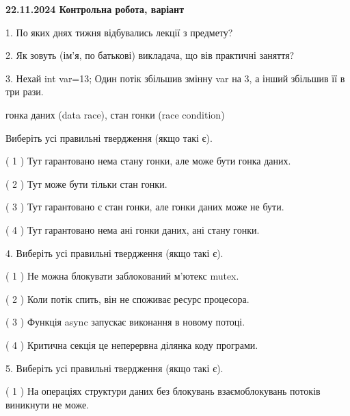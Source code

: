 \documentclass[12pt, ukrainian]{article}
\begin{document}
\vspace{4mm}
\newpage
\begin {large}

\textbf{22.11.2024 Контрольна робота, варіант  }\par


{
1. По яких днях тижня відбувались лекції з предмету?



\vspace{5mm}
2. Як зовуть (ім'я, по батькові) викладача, що вів практичні заняття?



\vspace{5mm}
3. Нехай int var=13; Один потік збільшив змінну var на 3, а інший збільшив її в три рази.

гонка даних (data race), стан гонки (race condition)

Виберіть усі правильні твердження (якщо такі є).\par
\vspace{2mm}
( 1 ) Тут гарантовано нема стану гонки, але може бути гонка даних.%

( 2 ) Тут може бути тільки стан гонки.%

( 3 ) Тут гарантовано є стан гонки, але гонки даних може не бути.%

( 4 ) Тут гарантовано нема ані гонки даних, ані стану гонки.%


\vspace{5mm}
4. Виберіть усі правильні твердження (якщо такі є).\par
\vspace{2mm}

( 1 ) Не можна блокувати заблокований м’ютекс mutex.%

( 2 ) Коли потік спить, він не споживає ресурс процесора.%

( 3 ) Функція async запускає виконання в новому потоці.%

( 4 ) Критична секція це неперервна ділянка коду програми.%


\vspace{5mm}
5. Виберіть усі правильні твердження (якщо такі є).\par
\vspace{2mm}

( 1 ) На операціях структури даних без блокувань взаємоблокувань потоків виникнути не може.%

}
\end{large}
\end{document}

